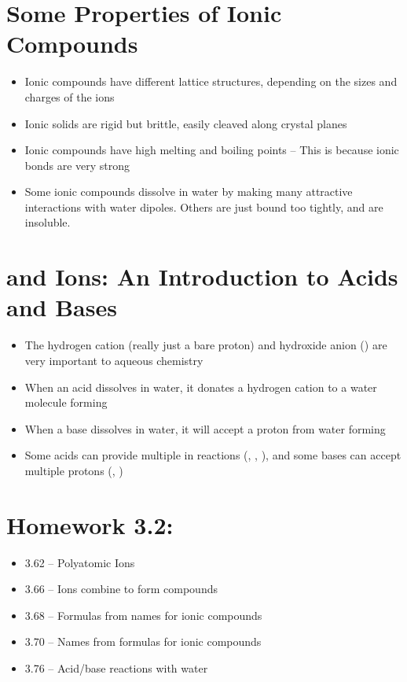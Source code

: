 \documentclass[12pt, openany, letterpaper]{memoir}
\begin{document}
\section{Some Properties of Ionic Compounds}
\begin{itemize}
	\item Ionic compounds have different lattice structures, depending on the sizes and charges of the ions
	\item Ionic solids are rigid but brittle, easily cleaved along crystal planes
	\item Ionic compounds have high melting and boiling points -- This is because ionic bonds are very strong
	\item Some ionic compounds dissolve in water by making many attractive interactions with water dipoles. Others are just bound too tightly, and are insoluble.
\end{itemize}

\section{ and  Ions: An Introduction to Acids and Bases}
\begin{itemize}
	\item The hydrogen cation (really just a bare proton) and hydroxide anion () are very important to aqueous chemistry
	\item When an acid dissolves in water, it donates a hydrogen cation to a water molecule forming 
	\item When a base dissolves in water, it will accept a proton from water forming 
	\item Some acids can provide multiple  in reactions (, , ), and some bases can accept multiple protons (, )
\end{itemize}

\section*{Homework 3.2:}
\begin{itemize}
	\item 3.62 -- Polyatomic Ions
	\item 3.66 -- Ions combine to form compounds
	\item 3.68 -- Formulas from names for ionic compounds
	\item 3.70 -- Names from formulas for ionic compounds
	\item 3.76 -- Acid/base reactions with water
\end{itemize}
\end{document}
